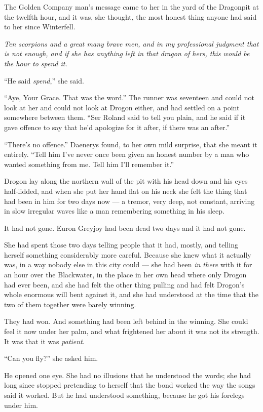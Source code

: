 The Golden Company man’s message came to her in the yard of the Dragonpit at the twelfth hour, and it was, she thought, the most honest thing anyone had said to her since Winterfell.

\textit{Ten scorpions and a great many brave men, and in my professional judgment that is not enough, and if she has anything left in that dragon of hers, this would be the hour to spend it.}

“He said \textit{spend},” she said.

“Aye, Your Grace. That was the word.” The runner was seventeen and could not look at her and could not look at Drogon either, and had settled on a point somewhere between them. “Ser Roland said to tell you plain, and he said if it gave offence to say that he’d apologize for it after, if there was an after.”

“There’s no offence.” Daenerys found, to her own mild surprise, that she meant it entirely. “Tell him I’ve never once been given an honest number by a man who wanted something from me. Tell him I’ll remember it.”

\sceneBreak

Drogon lay along the northern wall of the pit with his head down and his eyes half-lidded, and when she put her hand flat on his neck she felt the thing that had been in him for two days now — a tremor, very deep, not constant, arriving in slow irregular waves like a man remembering something in his sleep.

It had not gone. Euron Greyjoy had been dead two days and it had not gone.

She had spent those two days telling people that it had, mostly, and telling herself something considerably more careful. Because she knew what it actually was, in a way nobody else in this city could — she had been \textit{in there} with it for an hour over the Blackwater, in the place in her own head where only Drogon had ever been, and she had felt the other thing pulling and had felt Drogon’s whole enormous will bent against it, and she had understood at the time that the two of them together were barely winning.

They had won. And something had been left behind in the winning. She could feel it now under her palm, and what frightened her about it was not its strength. It was that it was \textit{patient}.

“Can you fly?” she asked him.

He opened one eye. She had no illusions that he understood the words; she had long since stopped pretending to herself that the bond worked the way the songs said it worked. But he had understood something, because he got his forelegs under him.

